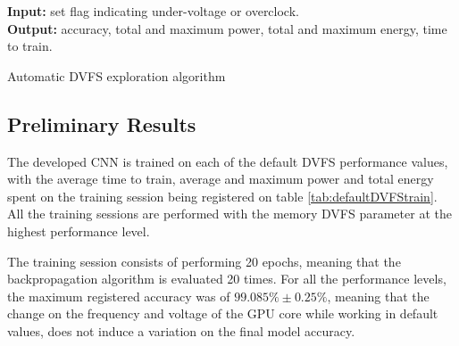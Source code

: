 \begin{algorithm}[!htb]
\label{alg:DVFSexp}
\SetAlgoLined
\textbf{Input:} set flag indicating under-voltage or overclock.\\
\textbf{Output:} accuracy, total and maximum power, total and maximum energy, time to train.\\
 \caption{Automatic DVFS exploration algorithm}
\end{algorithm}


\subsection{Preliminary Results}
\label{section:preliminaryresults}

The developed CNN is trained on each of the default DVFS performance values, with the average time to train, average and maximum power and total energy spent on the training session being registered on table \ref{tab:defaultDVFStrain}. All the training sessions are performed with the memory DVFS parameter at the highest performance level.

The training session consists of performing 20 epochs, meaning that the backpropagation algorithm is evaluated 20 times. For all the performance levels, the maximum registered accuracy was of $99.085\% \pm 0.25\% $, meaning that the change on the frequency and voltage of the GPU core while working in default values, does not induce a variation on the final model accuracy.

